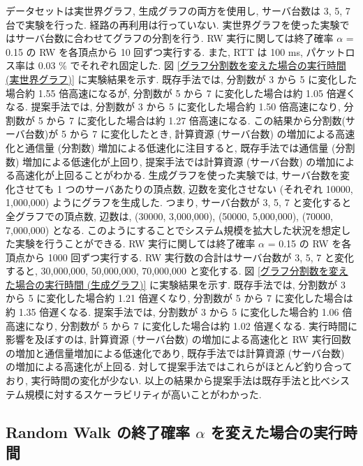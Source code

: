 データセットは実世界グラフ, 生成グラフの両方を使用し, サーバ台数は 3, 5, 7 台で実験を行った. 経路の再利用は行っていない. 実世界グラフを使った実験ではサーバ台数に合わせてグラフの分割を行う. RW 実行に関しては終了確率 $\alpha$ = 0.15 の RW を各頂点から 10 回ずつ実行する. また, RTT は 100 ms, パケットロス率は 0.03 \% でそれぞれ固定した. 図 \ref{グラフ分割数を変えた場合の実行時間 (実世界グラフ)} に実験結果を示す. 既存手法では, 分割数が 3 から 5 に変化した場合約 1.55 倍高速になるが, 分割数が 5 から 7 に変化した場合は約 1.05 倍遅くなる. 提案手法では, 分割数が 3 から 5 に変化した場合約 1.50 倍高速になり, 分割数が 5 から 7 に変化した場合は約 1.27 倍高速になる. この結果から分割数(サーバ台数)が 5 から 7 に変化したとき, 計算資源 (サーバ台数) の増加による高速化と通信量 (分割数) 増加による低速化に注目すると, 既存手法では通信量 (分割数) 増加による低速化が上回り, 提案手法では計算資源 (サーバ台数) の増加による高速化が上回ることがわかる. 生成グラフを使った実験では, サーバ台数を変化させても 1 つのサーバあたりの頂点数, 辺数を変化させない (それぞれ 10000, 1,000,000) ようにグラフを生成した. つまり, サーバ台数が 3, 5, 7 と変化すると全グラフでの頂点数, 辺数は, (30000, 3,000,000), (50000, 5,000,000), (70000, 7,000,000) となる. このようにすることでシステム規模を拡大した状況を想定した実験を行うことができる. RW 実行に関しては終了確率 $\alpha$ = 0.15 の RW を各頂点から 1000 回ずつ実行する. RW 実行数の合計はサーバ台数が 3, 5, 7 と変化すると, 30,000,000, 50,000,000, 70,000,000 と変化する. 図 \ref{グラフ分割数を変えた場合の実行時間 (生成グラフ)} に実験結果を示す. 既存手法では, 分割数が 3 から 5 に変化した場合約 1.21 倍遅くなり, 分割数が 5 から 7 に変化した場合は約 1.35 倍遅くなる. 提案手法では, 分割数が 3 から 5 に変化した場合約 1.06 倍高速になり, 分割数が 5 から 7 に変化した場合は約 1.02 倍遅くなる. 実行時間に影響を及ぼすのは, 計算資源 (サーバ台数) の増加による高速化と RW 実行回数の増加と通信量増加による低速化であり, 既存手法では計算資源 (サーバ台数) の増加による高速化が上回る. 対して提案手法ではこれらがほとんど釣り合っており, 実行時間の変化が少ない. 以上の結果から提案手法は既存手法と比べシステム規模に対するスケーラビリティが高いことがわかった. 

\subsection{Random Walk の終了確率 $\alpha$ を変えた場合の実行時間}\label{終了確率 alpha を変えた場合の実行時間}

